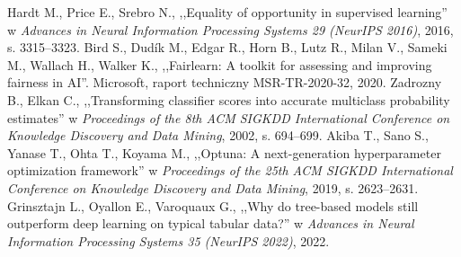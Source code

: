 %

 Hardt M., Price E., Srebro N., ,,Equality of opportunity in supervised learning'' w \textit{Advances in Neural Information Processing Systems 29 (NeurIPS 2016)}, 2016, s. 3315--3323.
 Bird S., Dud\'{i}k M., Edgar R., Horn B., Lutz R., Milan V., Sameki M., Wallach H., Walker K., ,,Fairlearn: A toolkit for assessing and improving fairness in AI''. Microsoft, raport techniczny MSR-TR-2020-32, 2020.
 Zadrozny B., Elkan C., ,,Transforming classifier scores into accurate multiclass probability estimates'' w \textit{Proceedings of the 8th ACM SIGKDD International Conference on Knowledge Discovery and Data Mining}, 2002, s. 694--699.
 Akiba T., Sano S., Yanase T., Ohta T., Koyama M., ,,Optuna: A next-generation hyperparameter optimization framework'' w \textit{Proceedings of the 25th ACM SIGKDD International Conference on Knowledge Discovery and Data Mining}, 2019, s. 2623--2631.
 Grinsztajn L., Oyallon E., Varoquaux G., ,,Why do tree-based models still outperform deep learning on typical tabular data?'' w \textit{Advances in Neural Information Processing Systems 35 (NeurIPS 2022)}, 2022.
